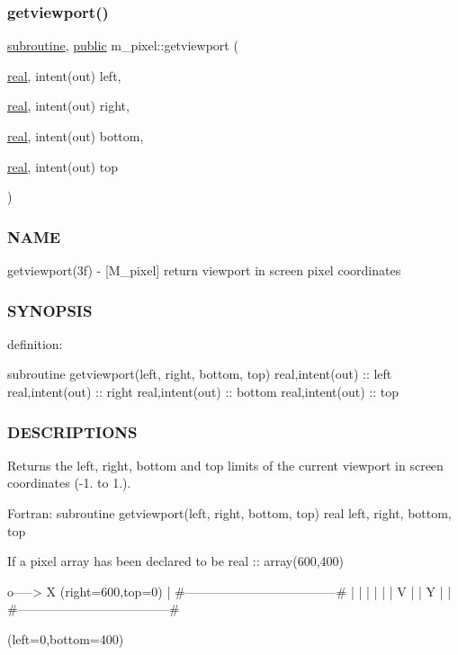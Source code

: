\subsubsection{\texorpdfstring{getviewport()}{getviewport()}}
{\footnotesize\ttfamily \hyperlink{M__stopwatch_83_8txt_acfbcff50169d691ff02d4a123ed70482}{subroutine}, \hyperlink{M__stopwatch_83_8txt_a2f74811300c361e53b430611a7d1769f}{public} m\+\_\+pixel\+::getviewport (\begin{DoxyParamCaption}\item[{\hyperlink{read__watch_83_8txt_abdb62bde002f38ef75f810d3a905a823}{real}, intent(out)}]{left,  }\item[{\hyperlink{read__watch_83_8txt_abdb62bde002f38ef75f810d3a905a823}{real}, intent(out)}]{right,  }\item[{\hyperlink{read__watch_83_8txt_abdb62bde002f38ef75f810d3a905a823}{real}, intent(out)}]{bottom,  }\item[{\hyperlink{read__watch_83_8txt_abdb62bde002f38ef75f810d3a905a823}{real}, intent(out)}]{top }\end{DoxyParamCaption})}



\subsubsection*{N\+A\+ME}

getviewport(3f) -\/ \mbox{[}M\+\_\+pixel\mbox{]} return viewport in screen pixel coordinates 

\subsubsection*{S\+Y\+N\+O\+P\+S\+IS}

definition\+:

subroutine getviewport(left, right, bottom, top) real,intent(out) \+:\+: left real,intent(out) \+:\+: right real,intent(out) \+:\+: bottom real,intent(out) \+:\+: top

\subsubsection*{D\+E\+S\+C\+R\+I\+P\+T\+I\+O\+NS}

Returns the left, right, bottom and top limits of the current viewport in screen coordinates (-\/1. to 1.). \begin{DoxyVerb}Fortran:
     subroutine getviewport(left, right, bottom, top)
     real left, right, bottom, top
\end{DoxyVerb}
 If a pixel array has been declared to be real \+:\+: array(600,400) \begin{DoxyVerb} o-----> X                         (right=600,top=0)
 | #------------------------------------#
 | |                                    |
 | |                                    |
 V |                                    |
 Y |                                    |
   #------------------------------------#
\end{DoxyVerb}
 (left=0,bottom=400)

